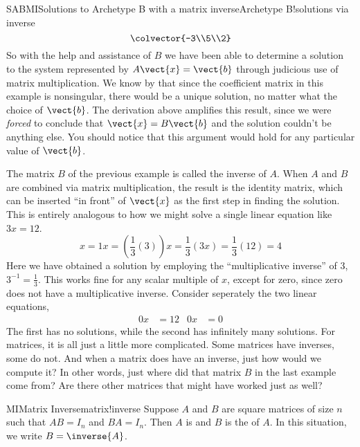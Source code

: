 \begin{example}{SABMI}{Solutions to Archetype B with a matrix inverse}{Archetype B!solutions via inverse}
\begin{equation*}
\colvector{-3\\5\\2}
\end{equation*}
%
So with the help and assistance of $B$ we have been able to determine a solution to the system represented by $A\vect{x}=\vect{b}$ through judicious use of matrix multiplication.  We know by  that since the coefficient matrix in this example is nonsingular, there would be a unique solution, no matter what the choice of $\vect{b}$.  The derivation above amplifies this result, since we were {\em forced} to conclude that $\vect{x}=B\vect{b}$ and the solution couldn't be anything else.  You should notice that this argument would hold for any particular value of $\vect{b}$.
\end{example}
%
The matrix $B$ of the previous example is called the inverse of $A$.  When $A$ and $B$ are combined via matrix multiplication, the result is the identity matrix, which can be inserted ``in front'' of  $\vect{x}$ as the first step in finding the solution.  This is entirely analogous to how we might solve a single linear equation like $3x=12$.
%
\begin{equation*}
x=1x=\left(\frac{1}{3}\left(3\right)\right)x=\frac{1}{3}\left(3x\right)=\frac{1}{3}\left(12\right)=4
\end{equation*}
%
Here we have obtained a solution by employing the ``multiplicative inverse'' of $3$, $3^{-1}=\frac{1}{3}$.  This works fine for any scalar multiple of $x$, except for zero, since zero does not have a multiplicative inverse.  Consider seperately the two linear equations,
%
\begin{align*}
0x&=12
&
0x&=0
\end{align*}
%
The first has no solutions, while the second has infinitely many solutions.  For matrices, it is all just a little more complicated.  Some matrices have inverses, some do not.  And when a matrix does have an inverse, just how would we compute it?  In other words, just where did that matrix $B$ in the last example come from?  Are there other matrices that might have worked just as well?
%
%
\begin{definition}{MI}{Matrix Inverse}{matrix!inverse}
Suppose $A$ and $B$ are square matrices of size $n$ such that $AB=I_n$ and $BA=I_n$.  Then $A$ is  and $B$ is the  of $A$.  In this situation, we write $B=\inverse{A}$.
\end{definition}
